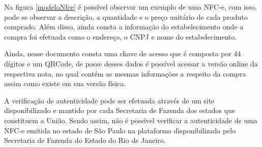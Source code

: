 Na figura \ref{modeloNfce} é possível observar um exemplo de uma NFC-e, com isso, pode se observar a descrição, a quantidade e o preço unitário de cada produto comprado. Além disso, ainda consta a informação do estabelecimento onde a compra foi efetuada como o endereço, o CNPJ e nome do estabelecimento.

Ainda, nesse documento consta uma chave de acesso que é composta por 44 dígitos e um QRCode, de posse desses dados é possível acessar a versão online da respectiva nota, no qual contém as mesmas informações a respeito da compra assim como existe em sua versão física.


A verificação de autenticidade pode ser efetuada através de um site disponibilizado e mantido por cada Secretaria de Fazenda dos estados que constituem a União. Sendo assim, não é possível verificar a autenticidade de uma NFC-e emitida no estado de São Paulo na plataforma disponibilizada pelo Secretaria de Fazenda do Estado do Rio de Janeiro.